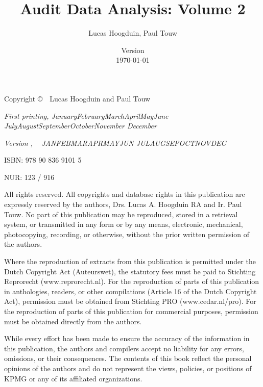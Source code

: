\documentclass[11pt]{memoir}
\title{Audit Data Analysis: Volume 2}
\author{Lucas Hoogduin, Paul Touw}
\date{Version \adaVersion\\\today}
\makeatletter
\theoremstyle{definition} %
\newcommand{\monthyear}{%
  \ifcase\month\or January\or February\or March\or April\or May\or June\or
  July\or August\or September\or October\or November\or
  December\fi\space\number\year
}
\def\today{%
  \two@digits{\the\day}~%
  \ifcase\month\or%
  JAN\or FEB\or MAR\or APR\or MAY\or JUN\or%
  JUL\or AUG\or SEP\or OCT\or NOV\or DEC\fi~%
  \number\year%
}
\makeatother
\begin{document}
\frontmatter

\maketitle

\cleardoublepage
\thispagestyle{empty}
\begin{raggedright}
\vspace*{\fill}
\setlength{\parindent}{0pt}
\setlength{\parskip}{\baselineskip}
Copyright \copyright\ \the\year\ Lucas Hoogduin and Paul Touw

\textit{First printing, \monthyear}

\textit{Version \adaVersion, \today}

ISBN: 978 90 836 9101 5 

NUR: 123 / 916

\bigskip
All rights reserved. All copyrights and database rights in this publication are expressly reserved by the authors, Drs. Lucas A. Hoogduin RA and Ir. Paul Touw. No part of this publication may be reproduced, stored in a retrieval system, or transmitted in any form or by any means, electronic, mechanical, photocopying, recording, or otherwise, without the prior written permission of the authors.

Where the reproduction of extracts from this publication is permitted under the Dutch Copyright Act (Auteurswet), the statutory fees must be paid to Stichting Reprorecht (www.reprorecht.nl). For the reproduction of parts of this publication in anthologies, readers, or other compilations (Article 16 of the Dutch Copyright Act), permission must be obtained from Stichting PRO (www.cedar.nl/pro). For the reproduction of parts of this publication for commercial purposes, permission must be obtained directly from the authors.

While every effort has been made to ensure the accuracy of the information in this publication, the authors and compilers accept no liability for any errors, omissions, or their consequences. The contents of this book reflect the personal opinions of the authors and do not represent the views, policies, or positions of KPMG or any of its affiliated organizations.

\vspace*{\fill}
\end{raggedright}

\cleardoublepage
\tableofcontents
\end{document}
